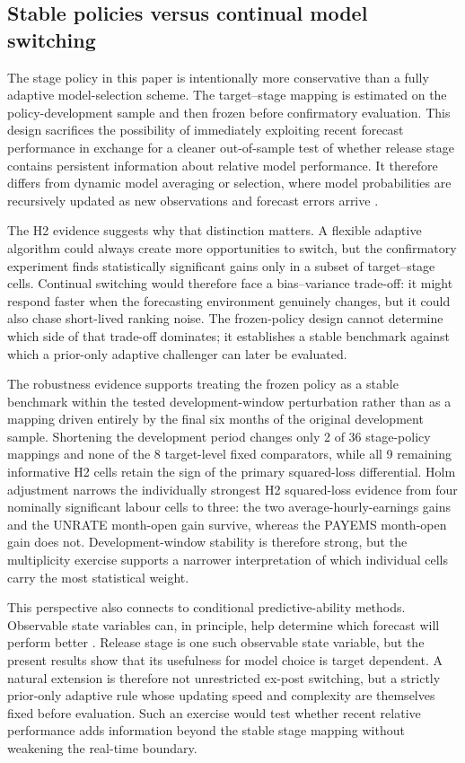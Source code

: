 \subsection{Stable policies versus continual model switching}
\label{subsec:policy_stability}

The stage policy in this paper is intentionally more conservative than a fully
adaptive model-selection scheme.  The target--stage mapping is estimated on
the policy-development sample and then frozen before confirmatory evaluation.
This design sacrifices the possibility of immediately exploiting recent
forecast performance in exchange for a cleaner out-of-sample test of whether
release stage contains persistent information about relative model
performance.  It therefore differs from dynamic model averaging or selection,
where model probabilities are recursively updated as new observations and
forecast errors arrive \citep{koopkorobilis2012dma}.

The H2 evidence suggests why that distinction matters.  A flexible adaptive
algorithm could always create more opportunities to switch, but the
confirmatory experiment finds statistically significant gains only in a subset
of target--stage cells.  Continual switching would therefore face a bias--variance trade-off:
it might respond faster when the forecasting environment genuinely changes,
but it could also chase short-lived ranking noise.  The frozen-policy design
cannot determine which side of that trade-off dominates; it establishes a
stable benchmark against which a prior-only adaptive challenger can later be
evaluated.

The robustness evidence supports treating the frozen policy as a stable
benchmark within the tested development-window perturbation rather than as a
mapping driven entirely by the final six months of the original development
sample. Shortening the
development period changes only 2 of 36 stage-policy mappings and none of the
8 target-level fixed comparators, while all 9 remaining informative H2 cells
retain the sign of the primary squared-loss differential. Holm adjustment
narrows the individually strongest H2 squared-loss evidence from four
nominally significant labour cells to three: the two average-hourly-earnings
gains and the UNRATE month-open gain survive, whereas the PAYEMS month-open
gain does not. Development-window stability is therefore strong, but the
multiplicity exercise supports a narrower interpretation of which individual
cells carry the most statistical weight.

This perspective also connects to conditional predictive-ability methods.
Observable state variables can, in principle, help determine which forecast
will perform better \citep{giacominiwhite2006conditional}.  Release stage is
one such observable state variable, but the present results show that its
usefulness for model choice is target dependent.  A natural extension is
therefore not unrestricted ex-post switching, but a strictly prior-only
adaptive rule whose updating speed and complexity are themselves fixed before
evaluation.  Such an exercise would test whether recent relative performance
adds information beyond the stable stage mapping without weakening the
real-time boundary.

